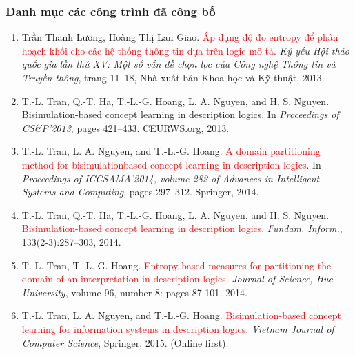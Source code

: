 \documentclass[notheorems,xcolor=dvipsnames]{beamer}
\begin{document}
\begin{frame}\frametitle{\bf Danh mục các công trình đã công bố}
	
\vspace{-1.0ex}
\begin{scriptsize}
	\begin{enumerate}
		\item Trần Thanh Lương, Hoàng Thị Lan Giao. \textcolor{red}{Áp dụng độ đo entropy để phân hoạch khối cho các hệ thống thông tin dựa trên logic mô tả}. {\em Kỷ yếu Hội thảo quốc gia lần thứ XV: Một số vấn đề chọn lọc của Công nghệ Thông tin và Truyền thông}, trang 11--18, Nhà xuất bản Khoa học và Kỹ thuật, 2013.	
		
		\item T.-L. Tran, Q.-T. Ha, T.-L.-G. Hoang, L. A. Nguyen, and H. S. Nguyen. Bisimulation-based concept learning in description logics. In {\em Proceedings of CS\&P'2013}, pages 421--433. CEURWS.org, 2013.
		
		\item T.-L. Tran, L. A. Nguyen, and T.-L.-G. Hoang. \textcolor{red}{A domain partitioning method for bisimulationbased concept learning in description logics}. In {\em Proceedings of ICCSAMA'2014, volume 282 of Advances in Intelligent Systems and Computing}, pages 297--312. Springer, 2014.
		
		\item T.-L. Tran, Q.-T. Ha, T.-L.-G. Hoang, L. A. Nguyen, and H. S. Nguyen. \textcolor{red}{Bisimulation-based concept learning in description logics}. {\em Fundam. Inform.}, 133(2-3):287--303, 2014.
		
		\item T.-L. Tran, T.-L.-G. Hoang. \textcolor{red}{Entropy-based measures for partitioning the domain of an interpretation in description logics}. {\em Journal of Science, Hue University}, volume 96, number 8: pages 87-101, 2014.
		
		\item T.-L. Tran, L. A. Nguyen, and  T.-L.-G. Hoang. \textcolor{red}{Bisimulation-based concept learning for information systems in description logics}. {\em Vietnam Journal of Computer Science}, Springer, 2015. (Online first).
	\end{enumerate}
\end{scriptsize}
\end{frame}
\end{document}
